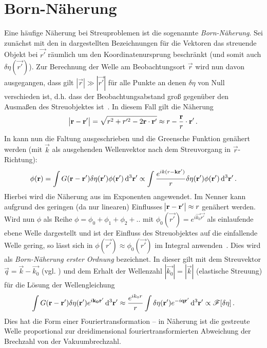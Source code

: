 \section{Born-Näherung}
Eine häufige Näherung bei Streuproblemen ist die sogenannte \textit{Born-Näherung}. Sei zunächst mit den in   dargestellten Bezeichnungen für die Vektoren das streuende Objekt bei $\vec{r'}$ räumlich um den Koordinatenursprung beschränkt (und somit auch $\delta\eta(\vec{r'})$). Zur Berechnung der Welle am Beobachtungsort $\vec{r}$ wird nun davon ausgegangen, dass gilt $|\vec{r}| \gg |\vec{r'}|$ für alle Punkte an denen $\delta\eta$ von Null verschieden ist, d.h. dass der Beobachtungsabstand groß gegenüber den Ausmaßen des Streuobjektes ist~\cite{griffiths2005}. In diesem Fall gilt die Näherung
\begin{equation}
	\abs{\mathbf{r}-\mathbf{r'}} = \sqrt{r^2+r'^2-2\mathbf{r}\cdot\mathbf{r'}} \approx r-\frac{\mathbf{r}}{r}\cdot\mathbf{r'} \,.
	\label{eq:born_r_approx}
\end{equation}
In  kann nun die Faltung ausgeschrieben und die Greensche Funktion genähert werden (mit $\vec{k}$ als ausgehenden Wellenvektor nach dem Streuvorgang in $\vec{r}$-Richtung):
\begin{equation}
	\phi(\mathbf{r})=\int G(\mathbf{r}-\mathbf{r'})\delta\eta(\mathbf{r'})\phi(\mathbf{r}') \operatorname{d^3 \!} \mathbf{r'} 
	\propto \int \frac{e^{ik(r-\mathbf{k}\mathbf{r'})}}{r}\delta\eta(\mathbf{r}')\phi(\mathbf{r}') \operatorname{d^3 \!} \mathbf{r'} \,.
	\label{eq:born_ort}
\end{equation}
Hierbei wird die Näherung aus  im Exponenten angewendet. Im Nenner kann aufgrund des geringen (da nur linearen) Einflusses $\abs{\mathbf{r}-\mathbf{r'}}\approx r$ genähert werden. Wird nun $\phi$ als Reihe $\phi=\phi_0+\phi_1+\phi_2+..$ mit $\phi_0(\vec{r'})=e^{i\vec{k_0}\vec{r'}}$ als einlaufende ebene Welle dargestellt und ist der Einfluss des Streuobjektes auf die einfallende Welle gering, so lässt sich in  $\phi(\vec{r'})\approx\phi_0(\vec{r'})$ im Integral anwenden~\cite{cowley1995}. Dies wird als \textit{Born-Näherung erster Ordnung} bezeichnet. In dieser gilt mit dem Streuvektor $\vec{q}=\vec{k}-\vec{k_0}$ (vgl. ) und dem Erhalt der Wellenzahl $|\vec{k_0}|=|\vec{k}|$ (elastische Streuung) für die Lösung der Wellengleichung
\begin{equation}
	\label{eq:born}
	\int G(\mathbf{r}-\mathbf{r}')\delta\eta(\mathbf{r}') e^{i\mathbf{k_0}\mathbf{r'}}  \operatorname{d^3 \!} \mathbf{r}'
	\approx \frac{e^{ik_0r}}{r}\int \delta\eta(\mathbf{r}')e^{-i\mathbf{q}\mathbf{r}'}\operatorname{d^3 \!} \mathbf{r}'\propto \mathscr{F}[\delta\eta] \,.
\end{equation} 
Dies hat die Form einer Fouriertransformation -- in Näherung ist die gestreute Welle proportional zur dreidimensional fouriertransformierten Abweichung der Brechzahl von der Vakuumbrechzahl.



